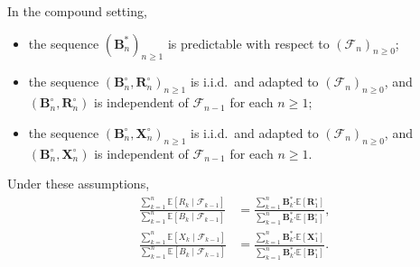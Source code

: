 \documentclass{article}
\theoremstyle{definition}
\theoremstyle{remark}
\newcommand{\E}{\mathbb{E}}
\newcommand{\F}{\mathscr{F}}
\begin{document}
In the compound setting, 
\begin{itemize}
    \item the sequence $(\bm B_n^*)_{n\ge1}$ is predictable with respect to $(\F_n)_{n\ge0}$;
    \item the sequence $(\bm B_n^\circ,\bm R_n^\circ)_{n\ge1}$ is i.i.d.\ and adapted to $(\F_n)_{n\ge0}$, and $(\bm B_n^\circ,\bm R_n^\circ)$ is independent of $\F_{n-1}$ for each $n\ge1$;
    \item the sequence $(\bm B_n^\circ,\bm X_n^\circ)_{n\ge1}$ is i.i.d.\ and adapted to $(\F_n)_{n\ge0}$, and $(\bm B_n^\circ,\bm X_n^\circ)$ is independent of $\F_{n-1}$ for each $n\ge1$.
\end{itemize}

Under these assumptions,
\begin{align*}
\frac{\sum_{k=1}^n \E[R_k\mid\F_{k-1}]}{\sum_{k=1}^n \E[B_k\mid\F_{k-1}]}&=\frac{\sum_{k=1}^n \bm B_k^*\bm\cdot\E[\bm R_1^\circ]}{\sum_{k=1}^n \bm B_k^*\bm\cdot\E[\bm B_1^\circ]},\\
\frac{\sum_{k=1}^n \E[X_k\mid\F_{k-1}]}{\sum_{k=1}^n \E[B_k\mid\F_{k-1}]}&=\frac{\sum_{k=1}^n \bm B_k^*\bm\cdot\E[\bm X_1^\circ]}{\sum_{k=1}^n \bm B_k^*\bm\cdot\E[\bm B_1^\circ]}.
\end{align*}
\end{document}
